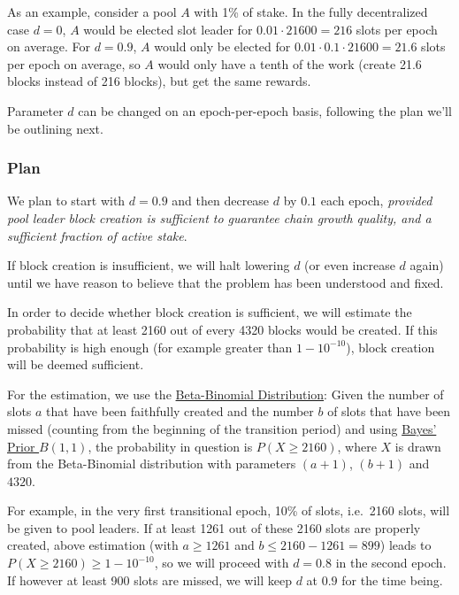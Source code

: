 \documentclass[11pt,a4paper]{article}
\begin{document}
As an example, consider a pool \(A\) with 1\% of stake. In the fully
decentralized case \(d=0\), \(A\) would be elected slot leader for
\(0.01\cdot 21600=216\) slots per epoch on average. For \(d=0.9\), \(A\)
would only be elected for \(0.01\cdot 0.1\cdot 21600=21.6\) slots per
epoch on average, so \(A\) would only have a tenth of the work (create
21.6 blocks instead of 216 blocks), but get the same rewards.

Parameter \(d\) can be changed on an epoch-per-epoch basis, following
the plan we'll be outlining next.

\subsubsection{Plan}
\label{plan}

We plan to start with \(d=0.9\) and then decrease \(d\) by \(0.1\) each
epoch, \emph{provided pool leader block creation is sufficient to
guarantee chain growth quality, and a sufficient fraction of active
stake}.

If block creation is insufficient, we will halt lowering \(d\) (or even
increase \(d\) again) until we have reason to believe that the problem
has been understood and fixed.

In order to decide whether block creation is sufficient, we will
estimate the probability that at least 2160 out of every 4320 blocks
would be created. If this probability is high enough (for example
greater than \(1 - 10^{-10}\)), block creation will be deemed
sufficient.

For the estimation, we use the
\href{https://en.wikipedia.org/wiki/Beta-binomial_distribution}{Beta-Binomial
Distribution}: Given the number of slots \(a\) that have been faithfully
created and the number \(b\) of slots that have been missed (counting
from the beginning of the transition period) and using
\href{https://en.wikipedia.org/wiki/Beta_distribution\#Bayes'_prior_probability_(Beta(1,1))}{Bayes'
Prior \(B(1,1)\)}, the probability in question is \(P(X\geq 2160)\),
where \(X\) is drawn from the Beta-Binomial distribution with parameters
\((a + 1)\), \((b + 1)\) and \(4320\).

For example, in the very first transitional epoch, 10\% of slots,
i.e.~2160 slots, will be given to pool leaders. If at least 1261 out of
these 2160 slots are properly created, above estimation (with
\(a\geq 1261\) and \(b\leq 2160-1261=899\)) leads to
\(P(X\geq 2160)\geq 1-10^{-10}\), so we will proceed with \(d=0.8\) in
the second epoch. If however at least 900 slots are missed, we will keep
\(d\) at \(0.9\) for the time being.
\end{document}
